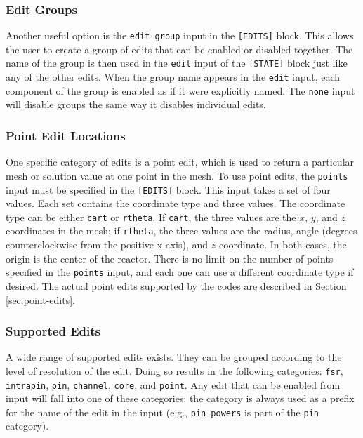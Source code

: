 \subsubsection{Edit Groups}

Another useful option is the \texttt{edit\_group} input in the \texttt{[EDITS]} block.  This allows the user to create a group of edits that can be enabled or disabled together.  The name of the group is then used in the \texttt{edit} input of the \texttt{[STATE]} block just like any of the other edits.  When the group name appears in the \texttt{edit} input, each component of the group is enabled as if it were explicitly named.  The \texttt{none} input will disable groups the same way it disables individual edits.

\subsubsection{Point Edit Locations}

One specific category of edits is a point edit, which is used to return a particular mesh or solution value at one point in the mesh.  To use point edits, the \texttt{points} input must be specified in the \texttt{[EDITS]} block.  This input takes a set of four values.  Each set contains the coordinate type and three values.  The coordinate type can be either \texttt{cart} or \texttt{rtheta}.  If \texttt{cart}, the three values are the $x$, $y$, and $z$ coordinates in the mesh; if \texttt{rtheta}, the three values are the radius, angle (degrees counterclockwise from the positive x axis), and $z$ coordinate.  In both cases, the origin is the center of the reactor.  There is no limit on the number of points specified in the \texttt{points} input, and each one can use a different coordinate type if desired.  The actual point edits supported by the codes are described in Section \ref{sec:point-edits}.

\subsubsection{Supported Edits}

A wide range of supported edits exists.  They can be grouped according to the level of resolution of the edit.  Doing so results in the following categories: \texttt{fsr}, \texttt{intrapin}, \texttt{pin}, \texttt{channel}, \texttt{core}, and \texttt{point}.  Any edit that can be enabled from input will fall into one of these categories; the category is always used as a prefix for the name of the edit in the input (e.g., \texttt{pin\_powers} is part of the \texttt{pin} category).


